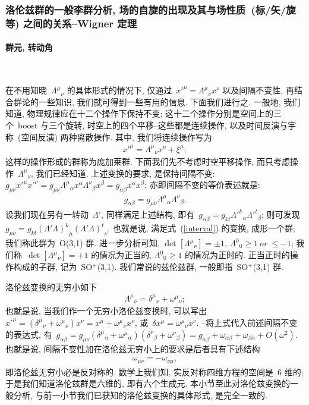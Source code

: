 \subsubsection{洛伦兹群的一般李群分析, 场的自旋的出现及其与场性质~(标/矢/旋等) 之间的关系--Wigner 定理}


\paragraph{群元, 转动角}
~

在不用知晓~${\Lambda^\mu}_\nu$ 的具体形式的情况下, 仅通过~$x'^\mu={\Lambda^\mu}_\nu x^\nu$ 以及间隔不变性, 再结合群论的一些知识, 我们就可得到一些有用的信息. 下面我们进行之. 一般地, 我们知道, 物理规律应在十二个操作下保持不变; 这十二个操作分别是空间上的三个~boost 与三个旋转, 时空上的四个平移--这些都是连续操作, 以及时间反演与宇称~(空间反演) 两种离散操作. 其中, 我们将连续操作写为
\begin{gather}
x'^\mu={\Lambda^\mu}_\nu x^\nu+\xi^\mu;
\end{gather}
这样的操作形成的群称为庞加莱群. 下面我们先不考虑时空平移操作, 而只考虑操作~${\Lambda^\mu}_\nu$. 我们已经知道, 上述变换的要求, 是保持间隔不变: $g_{\mu\nu}x'^\mu x'^\nu=g_{\mu\nu}{\Lambda^\mu}_\alpha x^\alpha{\Lambda^\nu}_\beta x^\beta=g_{\alpha\beta}x^\alpha x^\beta$; 亦即间隔不变的等价表述就是:
\begin{gather}\label{interval}
g_{\alpha\beta}=g_{\mu\nu}{\Lambda^\mu}_\alpha {\Lambda^\nu}_\beta.
\end{gather}
设我们现在另有一转动~$\Lambda'$, 同样满足上述结构, 即有~$g_{\alpha\beta}=g_{kt}{\Lambda'^k}_\alpha{\Lambda'^t}_\beta$; 则可发现~$g_{\mu\nu}=g_{kt}{(\Lambda'\Lambda)^k}_\mu{(\Lambda'\Lambda)^t}_\nu$. 也就是说, 满足式~(\ref{interval}) 的变换, 成形一个群; 我们称此群为~O(3,1) 群. 进一步分析可知, $\det[{\Lambda^\mu}_\nu]=\pm1,~{\Lambda^0}_0\geq1~or~\leq-1$; 我们称~$\det[{\Lambda^\mu}_\nu]=+1$ 的情况为正当的, ${\Lambda^0}_0\geq1$ 的情况为正时的. 正当正时的操作构成的子群, 记为~SO$^+$(3,1). 我们常说的兹伦兹群, 一般即指~SO$^+$(3,1) 群.


洛伦兹变换的无穷小如下
\begin{align}
{\Lambda^\mu}_\nu={\delta^\mu}_\nu+{\omega^\mu}_\nu;
\end{align}
也就是说, 当我们作一个无穷小洛伦兹变换时, 可以写出~$x'^\mu=({\delta^\mu}_\nu+{\omega^\mu}_\nu)x^\nu=x^\mu+{\omega^\mu}_\nu x^\nu$, 或~$\delta x^\mu={\omega^\mu}_\nu x^\nu$. --将上式代入前述间隔不变的表达式, 有~$g_{\alpha\beta}=g_{\mu\nu}({\delta^\mu}_\alpha+{\omega^\mu}_\alpha)({\delta^\nu}_\beta+{\omega^\nu}_\beta)=g_{\alpha\beta}+\omega_{\alpha\beta}+\omega_{\beta\alpha}+O(\omega^2)$. 也就是说, 间隔不变性加在洛伦兹无穷小上的要求是后者具有下述结构
\begin{align}
\omega_{\mu\nu}=-\omega_{\nu\mu},
\end{align}
即洛伦兹无穷小必是反对称的. 数学上我们知, 实反对称四维方程的空间是~6 维的; 于是我们知道洛伦兹群是六维的, 即有六个生成元. 本小节至此对洛伦兹变换的一般分析, 与前一小节我们已获知的洛伦兹变换的具体形式, 是完全一致的.




